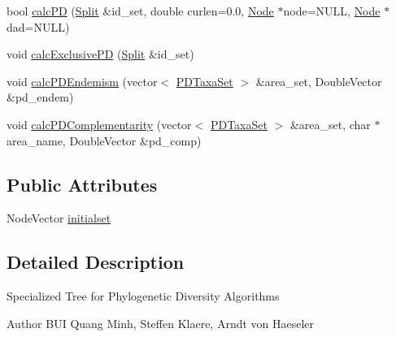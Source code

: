 \begin{DoxyCompactItemize}
\item 
bool \hyperlink{classPDTree_a0f7b9ac448266270a1e9d3d18218dc2e}{calcPD} (\hyperlink{classSplit}{Split} \&id\_\-set, double curlen=0.0, \hyperlink{classNode}{Node} $\ast$node=NULL, \hyperlink{classNode}{Node} $\ast$dad=NULL)
\item 
void \hyperlink{classPDTree_afe962ef278b4c52c969d073c8909a3e5}{calcExclusivePD} (\hyperlink{classSplit}{Split} \&id\_\-set)
\item 
void \hyperlink{classPDTree_ade969be738be4cf02944a1093bfbb52d}{calcPDEndemism} (vector$<$ \hyperlink{classPDTaxaSet}{PDTaxaSet} $>$ \&area\_\-set, DoubleVector \&pd\_\-endem)
\item 
void \hyperlink{classPDTree_acc3ea0e90a8788dcdea8d268a7139d31}{calcPDComplementarity} (vector$<$ \hyperlink{classPDTaxaSet}{PDTaxaSet} $>$ \&area\_\-set, char $\ast$area\_\-name, DoubleVector \&pd\_\-comp)
\end{DoxyCompactItemize}
\subsection*{Public Attributes}
\begin{DoxyCompactItemize}
\item 
NodeVector \hyperlink{classPDTree_aeb8c8f4c842f30b7a0d70b32546e7af1}{initialset}
\end{DoxyCompactItemize}


\subsection{Detailed Description}
Specialized Tree for Phylogenetic Diversity Algorithms \begin{DoxyAuthor}{Author}
BUI Quang Minh, Steffen Klaere, Arndt von Haeseler 
\end{DoxyAuthor}


